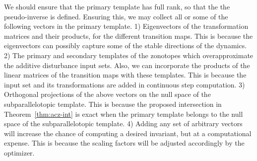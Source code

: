   We should ensure that the primary template has full rank, so that the the pseudo-inverse is defined. Ensuring this, we may collect all or some of
the following vectors in the primary template.
%
1) Eigenvectors of the transformation matrices and their products, for the
   different transition maps.  This is because the eigenvectors can
  possibly capture some of the stable directions of the dynamics.
2) The primary and secondary templates of the zonotopes which overapproximate the additive disturbance input sets.
  Also, we can incorporate the products of the linear matrices of the
  transition maps with these templates. This is because the input set and
  its transformations are added in continuous step computation.
3) Orthogonal projections of the above vectors on the null
  space of the subparallelotopic template.  This is because the
  proposed intersection in Theorem~\ref{thm:acz-int} is exact when the
  primary template belongs to the null space of the subparallelotopic
  template.
4) Adding any set of arbitrary vectors will increase the chance of computing a desired
  invariant, but at a computational expense.  This is because the
  scaling factors will be adjusted accordingly by the optimizer. 
